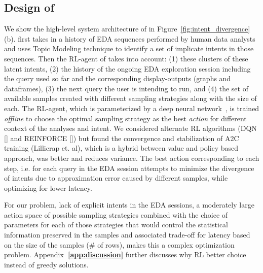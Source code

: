 \subsection{Design of \name{}}
We show the high-level system architecture of \name{} in Figure~\ref{fig:intent_divergence}(b).
\name{} first takes in a history of EDA sequences performed by human data analysts and uses Topic Modeling technique to identify a set of implicate intents in those sequences. 
Then the RL-agent of \name{} takes into account:
(1) these clusters of these latent intents,
(2) the history of the ongoing EDA exploration session including the query used so far and the corresponding display-outputs (graphs and dataframes),
(3) the next query the user is intending to run,
and (4) the set of available samples created with different sampling strategies along with the size of each. 
The RL-agent, which is parameterized by a deep neural network~\cite{lillicrap2015, mnih2015human}, is trained \textit{offline} to choose the optimal sampling strategy as the best \textit{action} for different context of the analyses and intent. We considered alternate RL algorithms (DQN [\cite{mnih2013playing}] and REINFORCE [\cite{sutton2018reinforcement}]) but found the convergence and stabilization of A2C training (Lillicrap et. al), which is a hybrid between value and policy based approach, was better and reduces variance.
The best action corresponding to each step, i.e. for each query in the EDA session attempts to minimize the divergence of intents due to approximation error caused by different samples, while optimizing for lower latency. 


For our problem, lack of explicit intents in the EDA sessions, a moderately large action space of possible sampling strategies combined with the choice of parameters for each of those strategies that would control the statistical information preserved in the samples and associated trade-off for latency based on the size of the samples ($\#$ of rows), makes this a complex optimization problem. 
Appendix\textbf{~\ref{app:discussion}} further discusses why RL better choice instead of greedy solutions.

